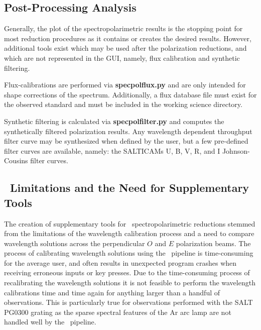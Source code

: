 \subsection{Post-Processing Analysis}

Generally, the plot of the spectropolarimetric results is the stopping point for most reduction procedures as it contains or creates the desired results. However, additional tools exist which may be used after the polarization reductions, and which are not represented in the \gls{GUI}, namely, flux calibration and synthetic filtering.

\pagebreak

Flux-calibrations are performed via \textbf{specpolflux.py} and are only intended for shape corrections of the spectrum. Additionally, a flux database file must exist for the observed standard and must be included in the working science directory.

Synthetic filtering is calculated via \textbf{specpolfilter.py} and computes the synthetically filtered polarization results.
Any wavelength dependent throughput filter curve may be synthesized when defined by the user, but a few pre-defined filter curves are available, namely: the \glspl{SALTICAM} \gls{U}, \gls{B}, \gls{V}, \gls{R}, and \gls{I} Johnson-Cousins filter curves.

\subsection[The Need for Supplementary Tools]{\polsalt\ Limitations and the Need for Supplementary Tools} \label{subsec:polsalt_limits}

The creation of supplementary tools for \polsalt\ spectropolarimetric reductions stemmed from the limitations of the wavelength calibration process and a need to compare wavelength solutions across the perpendicular $O$ and $E$ polarization beams. The process of calibrating wavelength solutions using the \polsalt\ pipeline is time-consuming for the average user, and often results in unexpected program crashes when receiving erroneous inputs or key presses. Due to the time-consuming process of recalibrating the wavelength solutions it is not feasible to perform the wavelength calibrations time and time again for anything larger than a handful of observations. This is particularly true for observations performed with the \gls{SALT} PG$0300$ grating as the sparse spectral features of the \gls{Ar} arc lamp are not handled well by the \polsalt\ pipeline.

